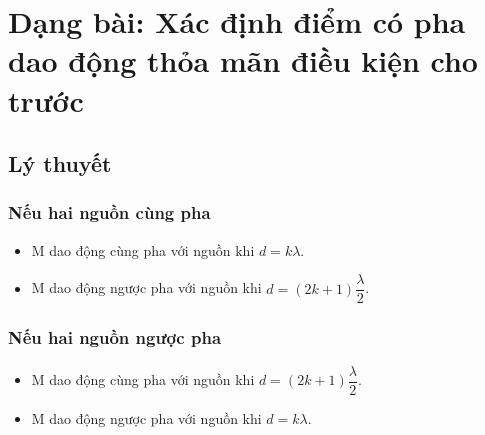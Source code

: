 
\chapter[Dạng bài: Xác định điểm có pha dao động thỏa mãn điều kiện cho trước]{Dạng bài: Xác định điểm có pha dao động thỏa mãn điều kiện cho trước}
\section{Lý thuyết}
\subsection{Nếu hai nguồn cùng pha}
\begin{itemize}
	\item M dao động cùng pha với nguồn khi $d=k\lambda$.
	
	\item M dao động ngược pha với nguồn khi $d = (2k+1) \dfrac{\lambda}{2}$.
\end{itemize}	
\subsection{Nếu hai nguồn ngược pha}	\begin{itemize}
	\item M dao động cùng pha với nguồn khi $d=(2k+1) \dfrac{\lambda}{2}$.
	
	\item M dao động ngược pha với nguồn khi $d=k\lambda$. 
\end{itemize}
